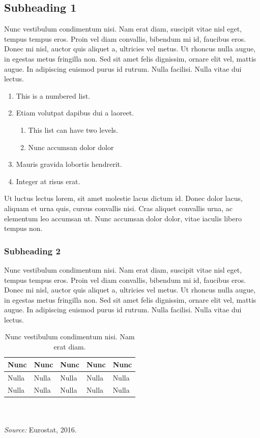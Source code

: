 \documentclass[10pt,a4paper]{article}
\begin{document}
\subsection{Subheading 1}
%
Nunc vestibulum condimentum nisi. Nam erat diam, suscipit vitae nisl eget, tempus tempus eros. Proin vel diam convallis, bibendum mi id, faucibus eros. Donec mi nisl, auctor quis aliquet a, ultricies vel metus. Ut rhoncus nulla augue, in egestas metus fringilla non. Sed sit amet felis dignissim, ornare elit vel, mattis augue. In adipiscing euismod purus id rutrum. Nulla facilisi. Nulla vitae dui lectus.
%
\begin{enumerate}
	\item This is a numbered list.
	\item Etiam volutpat dapibus dui a laoreet.
	\begin{enumerate}
		\item	This list can have two levels.
		\item	Nunc accumsan dolor dolor
	\end{enumerate}
	\item Mauris gravida lobortis hendrerit. 
	\item Integer at risus erat. 
\end{enumerate}
Ut luctus lectus lorem, sit amet molestie lacus dictum id. Donec dolor lacus, aliquam et urna quis, cursus convallis nisi. Cras aliquet convallis urna, ac elementum leo accumsan ut. Nunc accumsan dolor dolor, vitae iaculis libero tempus non.


\subsubsection{Subheading 2}
Nunc vestibulum condimentum nisi. Nam erat diam, suscipit vitae nisl eget, tempus tempus eros. Proin vel diam convallis, bibendum mi id, faucibus eros. Donec mi nisl, auctor quis aliquet a, ultricies vel metus. Ut rhoncus nulla augue, in egestas metus fringilla non. Sed sit amet felis dignissim, ornare elit vel, mattis augue. In adipiscing euismod purus id rutrum. Nulla facilisi. Nulla vitae dui lectus.

\renewcommand{\arraystretch}{2}
\begin{table}
		\caption{Nunc vestibulum condimentum nisi. Nam erat diam.}
		\begin{tabular}{|p{}|p{}|p{}|p{}|p{}|}\hline
				\textbf{Nunc} &	\textbf{Nunc} &	\textbf{Nunc} &	\textbf{Nunc} &	\textbf{Nunc} \\ \hline 
							Nulla	& Nulla	& Nulla	& Nulla	& Nulla\\\hline 
							Nulla	& Nulla	& Nulla	& Nulla	& Nulla\\\hline
		\end{tabular}
	\\
	~\\
		\textit{Source:} Eurostat, 2016.
\end{table}
\newpage
%
\end{document}
